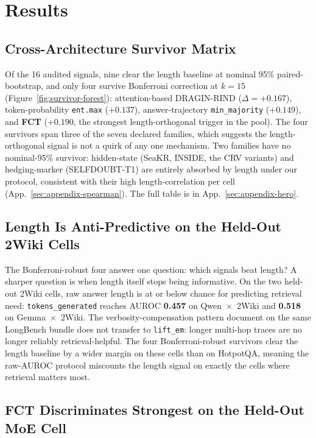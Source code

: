 \documentclass[11pt]{article}
\begin{document}
\section{Results}
\label{sec:results}

\subsection{Cross-Architecture Survivor Matrix}
\label{sec:results-matrix}

Of the 16 audited signals, nine clear the length baseline at nominal 95\% paired-bootstrap, and only four survive Bonferroni correction at $k{=}15$ (Figure~\ref{fig:survivor-forest}): attention-based DRAGIN-RIND ($\Delta = +0.167$), token-probability \texttt{ent.max} ($+0.137$), answer-trajectory \texttt{min\_majority} ($+0.149$), and \textbf{FCT} ($+0.190$, the strongest length-orthogonal trigger in the pool). The four survivors span three of the seven declared families, which suggests the length-orthogonal signal is not a quirk of any one mechanism. Two families have no nominal-95\% survivor: hidden-state (SeaKR, INSIDE, the CRV variants) and hedging-marker (SELFDOUBT-T1) are entirely absorbed by length under our protocol, consistent with their high length-correlation per cell (App.~\ref{sec:appendix-spearman}). The full table is in App.~\ref{sec:appendix-hero}.

\subsection{Length Is Anti-Predictive on the Held-Out 2Wiki Cells}
\label{sec:results-inverted}

The Bonferroni-robust four answer one question: which signals beat length? A sharper question is when length itself stops being informative. On the two held-out 2Wiki cells, raw answer length is at or below chance for predicting retrieval need: \texttt{tokens\_generated} reaches AUROC \textbf{0.457} on Qwen~$\times$~2Wiki and \textbf{0.518} on Gemma~$\times$~2Wiki. The verbosity-compensation pattern \citet{zhang_verbosity_2024} document on the same LongBench bundle does not transfer to \texttt{lift\_em}: longer multi-hop traces are no longer reliably retrieval-helpful. The four Bonferroni-robust survivors clear the length baseline by a wider margin on these cells than on HotpotQA, meaning the raw-AUROC protocol miscounts the length signal on exactly the cells where retrieval matters most.

\subsection{FCT Discriminates Strongest on the Held-Out MoE Cell}
\label{sec:results-fct-percell}
\end{document}
